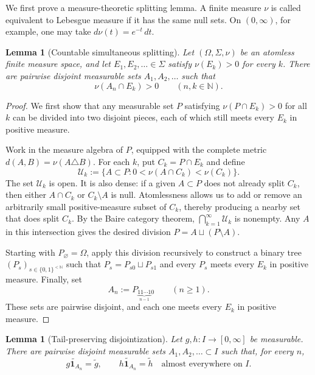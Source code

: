 \documentclass[11pt]{article}
\newtheorem{lemma}[theorem]{Lemma}
\theoremstyle{remark}
\newcommand{\one}{\mathbf 1}
\begin{document}
We first prove a measure-theoretic splitting lemma.  A finite measure
$\nu$ is called equivalent to Lebesgue measure if it has the same null sets.
On $(0,\infty)$, for example, one may take $d\nu(t)=e^{-t}\,dt$.

\begin{lemma}[Countable simultaneous splitting]\label{lem:split}
Let $(\Omega,\Sigma,\nu)$ be an atomless finite measure space, and let
$E_1,E_2,\ldots\in\Sigma$ satisfy $\nu(E_k)>0$ for every $k$.  There are
pairwise disjoint measurable sets $A_1,A_2,\ldots$ such that
\[
 \nu(A_n\cap E_k)>0\qquad(n,k\in\mathbb N).
\]
\end{lemma}

\begin{proof}
We first show that any measurable set $P$ satisfying
$\nu(P\cap E_k)>0$ for all $k$ can be divided into two disjoint pieces, each
of which still meets every $E_k$ in positive measure.

Work in the measure algebra of $P$, equipped with the complete metric
$d(A,B)=\nu(A\triangle B)$.  For each $k$, put $C_k=P\cap E_k$ and define
\[
 \mathcal U_k:=\bigl\{A\subset P:
        0<\nu(A\cap C_k)<\nu(C_k)\bigr\}.
\]
The set $\mathcal U_k$ is open.  It is also dense: if a given $A\subset P$
does not already split $C_k$, then either $A\cap C_k$ or $C_k\setminus A$ is
null.  Atomlessness allows us to add or remove an arbitrarily small
positive-measure subset of $C_k$, thereby producing a nearby set that does
split $C_k$.  By the Baire category theorem,
$\bigcap_{k=1}^\infty\mathcal U_k$ is nonempty.  Any $A$ in this intersection
gives the desired division $P=A\sqcup(P\setminus A)$.

Starting with $P_\varnothing=\Omega$, apply this division recursively to
construct a binary tree $(P_s)_{s\in\{0,1\}^{<\mathbb N}}$ such that
$P_s=P_{s0}\sqcup P_{s1}$ and every $P_s$ meets every $E_k$ in positive
measure.  Finally, set
\[
 A_n:=P_{\underbrace{11\cdots1}_{n-1}0}\qquad(n\geq1).
\]
These sets are pairwise disjoint, and each one meets every $E_k$ in positive
measure.
\end{proof}

\begin{lemma}[Tail-preserving disjointization]\label{lem:tail}
Let $g,h:I\to[0,\infty]$ be measurable.  There are pairwise disjoint
measurable sets $A_1,A_2,\ldots\subset I$ such that, for every $n$,
\begin{equation}\label{eq:tail-preserve}
 \widetilde{g\one_{A_n}}=\widetilde g,
 \qquad
 \widetilde{h\one_{A_n}}=\widetilde h
 \quad\text{almost everywhere on }I.
\end{equation}
\end{lemma}
\end{document}
